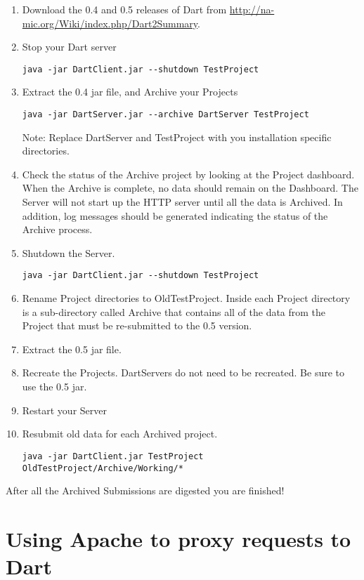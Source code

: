 \documentclass{InsightBook}
\begin{document}
\begin{enumerate}
\item Download the 0.4 and 0.5 releases of Dart from
\url{http://na-mic.org/Wiki/index.php/Dart2Summary}.
\item Stop your Dart server
\begin{verbatim}
java -jar DartClient.jar --shutdown TestProject
\end{verbatim}
\item Extract the 0.4 jar file, and Archive your Projects
\begin{verbatim}
java -jar DartServer.jar --archive DartServer TestProject
\end{verbatim}
Note: Replace DartServer and TestProject with you installation
specific directories.
\item Check the status of the Archive project by looking at the
Project dashboard.  When the Archive is complete, no data should
remain on the Dashboard.  The Server will not start up the HTTP server
until all the data is Archived.  In addition, log messages should be
generated indicating the status of the Archive process.
\item Shutdown the Server.
\begin{verbatim}
java -jar DartClient.jar --shutdown TestProject
\end{verbatim}
\item Rename Project directories to OldTestProject.  Inside each
Project directory is a sub-directory called Archive that contains all
of the data from the Project that must be re-submitted to the 0.5
version.
\item Extract the 0.5 jar file.
\item Recreate the Projects.  DartServers do not need to be
recreated.  Be sure to use the 0.5 jar.
\item Restart your Server
\item Resubmit old data for each Archived project.
\begin{verbatim}
java -jar DartClient.jar TestProject OldTestProject/Archive/Working/*
\end{verbatim}
\end{enumerate}

After all the Archived Submissions are digested you are finished!

\section{Using Apache to proxy requests to Dart}
\end{document}
